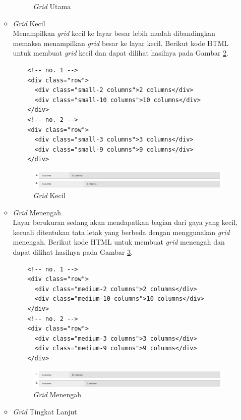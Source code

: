 \begin{enumerate}[(1)]
\begin{itemize}
\begin{figure}[H]
	\caption[{\it Grid} Utama]{{\it Grid} Utama}
	\label{fig:gridutama}
	\end{figure}
  \item {\it Grid} Kecil\\
  Menampilkan {\it grid} kecil ke layar besar lebih mudah dibandingkan memaksa
  menampilkan {\it grid} besar ke layar kecil. Berikut kode HTML untuk membuat
  {\it grid} kecil dan dapat dilihat hasilnya pada Gambar \ref{fig:gridkecil}.
  	\begin{lstlisting}
  	<!-- no. 1 -->
  	<div class="row">
	  <div class="small-2 columns">2 columns</div>
	  <div class="small-10 columns">10 columns</div>
	</div>
	<!-- no. 2 -->
	<div class="row">
	  <div class="small-3 columns">3 columns</div>
	  <div class="small-9 columns">9 columns</div>
	</div>
  	\end{lstlisting}
  	\begin{figure}[H]
	\centering
	\includegraphics[scale=0.6]{Gambar/gridkecil.png}
	\caption[{\it Grid} Kecil]{{\it Grid} Kecil}
	\label{fig:gridkecil}
	\end{figure}
  \item {\it Grid} Menengah\\
  Layar berukuran sedang akan mendapatkan bagian dari gaya yang kecil, kecuali
  ditentukan tata letak yang berbeda dengan menggunakan {\it grid} menengah.
  Berikut kode HTML untuk membuat {\it grid} menengah dan dapat dilihat
  hasilnya pada Gambar \ref{fig:gridmenengah}.
  	\begin{lstlisting}
  	<!-- no. 1 -->
  	<div class="row">
	  <div class="medium-2 columns">2 columns</div>
	  <div class="medium-10 columns">10 columns</div>
	</div>
	<!-- no. 2 -->
	<div class="row">
	  <div class="medium-3 columns">3 columns</div>
	  <div class="medium-9 columns">9 columns</div>
	</div>
  	\end{lstlisting}
  	\begin{figure}[H]
	\centering
	\includegraphics[scale=0.6]{Gambar/gridmenengah.png}
	\caption[{\it Grid} Menengah]{{\it Grid} Menengah}
	\label{fig:gridmenengah}
	\end{figure}
  \item {\it Grid} Tingkat Lanjut\\

\end{itemize}
\end{enumerate}
